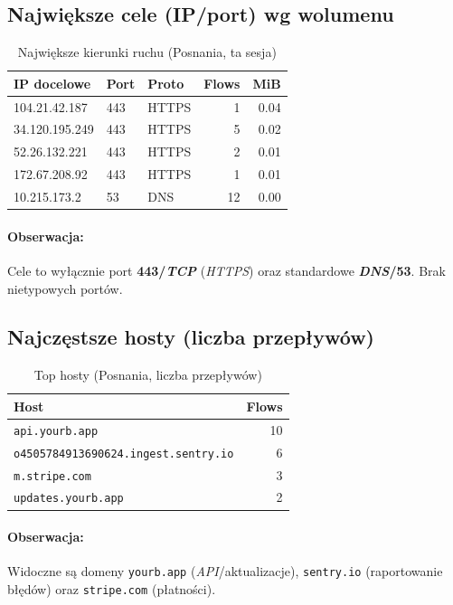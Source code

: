 \subsection{Największe cele (IP/port) wg wolumenu}
\begin{table}[H]
  \centering
  \caption{Największe kierunki ruchu (Posnania, ta sesja)}
  \label{tab:posnania-topdst}
  \begin{tabular}{lllrr}
    \toprule
    \textbf{IP docelowe} & \textbf{Port} & \textbf{Proto} & \textbf{Flows} & \textbf{MiB} \\
    \midrule
    104.21.42.187  & 443 & HTTPS & 1  & 0.04 \\
    34.120.195.249 & 443 & HTTPS & 5  & 0.02 \\
    52.26.132.221  & 443 & HTTPS & 2  & 0.01 \\
    172.67.208.92  & 443 & HTTPS & 1  & 0.01 \\
    10.215.173.2   & 53  & DNS   & 12 & 0.00 \\
    \bottomrule
  \end{tabular}
\end{table}

\paragraph{Obserwacja:}
Cele to wyłącznie port \textbf{443/\emph{TCP}} (\emph{HTTPS}) oraz standardowe \textbf{\emph{DNS}/53}. Brak nietypowych portów.

\subsection{Najczęstsze hosty (liczba przepływów)}
\begin{table}[H]
  \centering
  \caption{Top hosty (Posnania, liczba przepływów)}
  \label{tab:posnania-hosts}
  \begin{tabular}{lr}
    \toprule
    \textbf{Host} & \textbf{Flows} \\
    \midrule
    \texttt{api.yourb.app} & 10 \\
    \texttt{o4505784913690624.ingest.sentry.io} & 6 \\
    \texttt{m.stripe.com} & 3 \\
    \texttt{updates.yourb.app} & 2 \\
    \bottomrule
  \end{tabular}
\end{table}

\paragraph{Obserwacja:}
Widoczne są domeny \texttt{yourb.app} (\emph{API}/aktualizacje), \texttt{sentry.io} (raportowanie błędów) oraz \texttt{stripe.com} (płatności).

